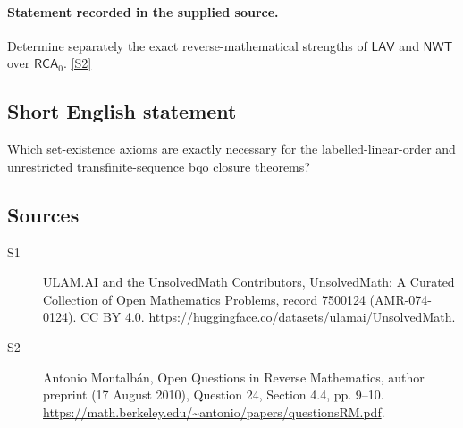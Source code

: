 \documentclass[11pt]{article}
\newcommand{\sref}[2]{\hyperlink{source:#1:#2}{[S#2]}}
\begin{document}
\paragraph{Statement recorded in the supplied source.}
Determine separately the exact reverse-mathematical strengths of $\mathsf{LAV}$ and $\mathsf{NWT}$ over $\mathsf{RCA}_0$. \sref{7500124}{2}
\subsection{Short English statement}
Which set-existence axioms are exactly necessary for the labelled-linear-order and unrestricted transfinite-sequence bqo closure theorems?
\subsection{Sources}
\begin{description}
\item[\hypertarget{source:7500124:1}{S1}] ULAM.AI and the UnsolvedMath Contributors, UnsolvedMath: A Curated Collection of Open Mathematics Problems, record 7500124 (AMR-074-0124). CC BY 4.0. \url{https://huggingface.co/datasets/ulamai/UnsolvedMath}.
\item[\hypertarget{source:7500124:2}{S2}] Antonio Montalbán, Open Questions in Reverse Mathematics, author preprint (17 August 2010), Question 24, Section 4.4, pp. 9--10. \url{https://math.berkeley.edu/~antonio/papers/questionsRM.pdf}.
\end{description}
\label{end:7500124}
\end{document}
